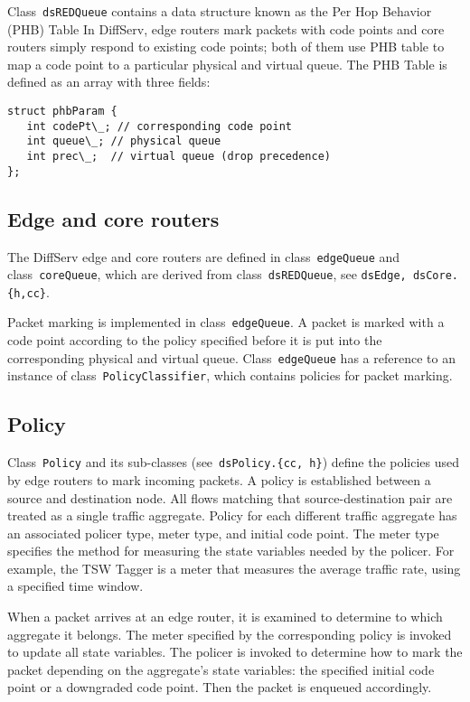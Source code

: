 Class~{\tt dsREDQueue} contains a data structure known as 
  the Per Hop Behavior (PHB) Table 
In DiffServ, edge routers mark packets with code points and 
  core routers simply respond to existing code points;
  both of them use PHB table to map a code point to 
  a particular physical and virtual queue.
The PHB Table is defined as an array with three fields:

\begin{verbatim}
struct phbParam {
   int codePt\_; // corresponding code point
   int queue\_;	// physical queue
   int prec\_;	// virtual queue (drop precedence)
};
\end{verbatim}


\subsection{Edge and core routers}
\label{sec:dsedge}
The DiffServ edge and core routers are defined in 
  class~{\tt edgeQueue} and class~{\tt coreQueue}, 
  which are derived from class~{\tt dsREDQueue},
  see {\tt dsEdge, dsCore.\{h,cc\}}. 

Packet marking is implemented in class~{\tt edgeQueue}.
A packet is marked with a code point according to 
  the policy specified
  before it is put into the corresponding physical and virtual queue.
Class~{\tt edgeQueue} has a reference to an instance of 
  class~{\tt PolicyClassifier},
  which contains policies for packet marking.

\subsection{Policy}
\label{sec:dspolicy}
Class~{\tt Policy} and its sub-classes (see~{\tt dsPolicy.\{cc, h\}}) 
  define the policies used by edge routers to mark incoming packets.
A policy is established between a source and destination node.  
All flows matching that source-destination pair are 
  treated as a single traffic aggregate.
Policy for each different traffic aggregate has 
  an associated policer type, meter type, and initial code point.  
The meter type specifies the method for measuring the state variables 
  needed by the policer.  
For example, 
  the TSW Tagger is a meter that measures the average traffic rate, 
  using a specified time window.

When a packet arrives at an edge router, 
  it is examined to determine to which aggregate it belongs.  
The meter specified by the corresponding policy is invoked to 
  update all state variables.  
The policer is invoked to determine how to mark the packet
  depending on the aggregate's state variables:
  the specified initial code point or 
  a downgraded code point.
Then the packet is enqueued accordingly.

